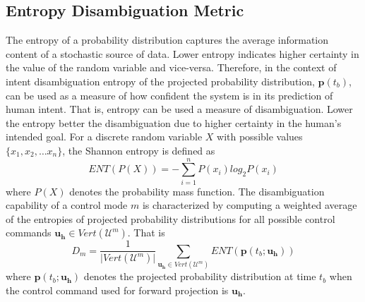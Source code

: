 \documentclass[conference]{IEEEtran}
\begin{document}
\subsection{Entropy Disambiguation Metric}\label{sssec:ent}
The entropy of a probability distribution captures the average information content of a stochastic source of data. Lower entropy indicates higher certainty in the value of the random variable and vice-versa. Therefore, in the context of intent disambiguation entropy of the projected probability distribution, $\boldsymbol{p}(t_b)$, can be used as a measure of how confident the system is in its prediction of human intent. That is, entropy can be used a measure of disambiguation. Lower the entropy better the disambiguation due to higher certainty in the human's intended goal. For a discrete random variable $X$ with possible values $\{x_1, x_2,\dots x_n\}$, the Shannon entropy is defined as 
\begin{equation*}
ENT(P(X)) = -\sum_{i = 1}^{n} P(x_i)log_{2}P(x_i)
\end{equation*}
where $P(X)$ denotes the probability mass function.
The disambiguation capability of a control mode $m$ is characterized by computing a weighted average of the entropies of projected probability distributions for all possible control commands $\boldsymbol{u_h} \in Vert(\mathcal{U}^m)$.
That is
\begin{equation*}
D_m = \frac{1}{\vert Vert(\mathcal{U}^m) \vert}\sum_{\boldsymbol{u_h} \in Vert(\mathcal{U}^m)}  ENT(\boldsymbol{p}(t_b; \boldsymbol{u_h}))
\end{equation*}
where $\boldsymbol{p}(t_b; \boldsymbol{u_h})$ denotes the projected probability distribution at time $t_b$ when the control command used for forward projection is $\boldsymbol{u_h}$.
\end{document}
